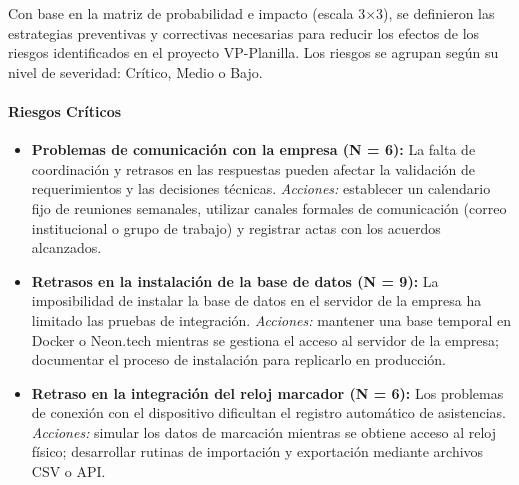 Con base en la matriz de probabilidad e impacto (escala 3×3), se definieron las estrategias preventivas y correctivas necesarias para reducir los efectos de los riesgos identificados en el proyecto VP-Planilla. Los riesgos se agrupan según su nivel de severidad: Crítico, Medio o Bajo.

\paragraph{Riesgos Críticos}
\begin{itemize}
	\item \textbf{Problemas de comunicación con la empresa (N = 6):}
	      La falta de coordinación y retrasos en las respuestas pueden afectar la validación de requerimientos y las decisiones técnicas.
	      \textit{Acciones:} establecer un calendario fijo de reuniones semanales, utilizar canales formales de comunicación (correo institucional o grupo de trabajo) y registrar actas con los acuerdos alcanzados.

	\item \textbf{Retrasos en la instalación de la base de datos (N = 9):}
	      La imposibilidad de instalar la base de datos en el servidor de la empresa ha limitado las pruebas de integración.
	      \textit{Acciones:} mantener una base temporal en Docker o Neon.tech mientras se gestiona el acceso al servidor de la empresa; documentar el proceso de instalación para replicarlo en producción.

	\item \textbf{Retraso en la integración del reloj marcador (N = 6):}
	      Los problemas de conexión con el dispositivo dificultan el registro automático de asistencias.
	      \textit{Acciones:} simular los datos de marcación mientras se obtiene acceso al reloj físico; desarrollar rutinas de importación y exportación mediante archivos CSV o API.
\end{itemize}

